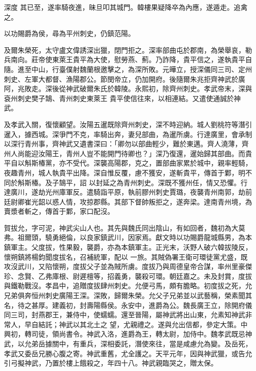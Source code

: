 \begin{pinyinscope}
 深度
 其已至，遂率騎夜進，昧旦叩其城門。韓樓果疑降卒為內應，遂遁走。追禽之。



 以功賜爵為侯，尋為平州刺史，仍鎮范陽。



 及爾朱榮死，太守盧文偉誘深出獵，閉門拒之。深率部曲屯於郡南，為榮舉哀，勒兵南向。莊帝使東萊王貴平為大使，慰勞燕、薊。乃詐降，貴平信之，遂執貴平自隨。進至中山，行臺僕射魏蘭根邀擊之，為深所敗。元曄立，授深儀同三司、定州刺史、左軍大都督、漁陽郡公。節閔帝立，仍加開府。後隨爾朱兆拒齊神武於廣阿，兆敗走。深後從神武破爾朱氏於韓陵。永熙初，除齊州刺史。孝武帝末，深與袞州刺史樊子鵠、青州刺史東萊王
 貴平使信往來，以相連結。又遣使通誠於神武。



 及孝武入關，復懷顧望。汝陽五暹既除齊州刺史，深不時迎納。城人劉桃符等潛引暹入，據西城。深爭門不克，率騎出奔，妻兒部曲，為暹所虜。行達廣里，會承制以深行青州事，齊神武又遺書深曰：「卿勿以部曲輕少，難於東邁。齊人澆薄，齊州人尚能迎汝陽王，青州人豈不能開門待卿也？」深乃復還，暹始歸其部曲。而貴平自以斛斯椿黨，亦不受代。深襲高陽郡，克之，置部曲家累於城中，親率輕騎，夜趣青州，城人執貴平出降。深自惟反覆，慮不獲安，遂斬貴平，傳首于鄴，明不同於斛斯椿。及子鵠平，詔
 以封延之為青州刺史。深既不獲州任，情又恐懼。行達廣川，遂劫光州庫軍反。遣騎詣平原，執前膠州刺史賈璐，夜襲青州南郭，劫前廷尉卿崔光韶以惑人情，攻掠郡縣。其部下督帥叛拒之，遂奔梁。達南青州境，為賣漿者斬之，傳首于鄴，家口配沒。



 賀拔允，字可泥，神武尖山人也。其先與魏氏同出陰山，有如回者，魏初為大莫弗。祖爾頭，驍勇絕倫，以良家鎮武川，因家焉。獻文時以功賜爵龍城縣男，為本鎮軍主。父度拔，性果毅，襲爵，亦為本鎮軍主。正光末，沃野人破六韓拔陵反，懷朔鎮將楊鈞聞度拔名，召補統軍，配以
 一旅。其賊偽署王衛可環徒黨尤盛，既攻沒武川，又陷懷朔，度拔父子並為賊所虜。度拔乃與周德皇帝合謀，率州里豪傑珍、念賢、乙弗庫根、尉遲檀等，招義勇，襲殺可環。朝廷嘉之。未及封賞，度拔與鐵勒戰沒。孝昌中，追贈度拔肆州刺史。允便弓馬，頗有膽略。初度拔之死，允兄弟俱奔恒州刺史廣陽王深。深敗，歸爾朱榮。允父子兄弟並以武藝稱，榮素聞其名，待之甚厚。建義初，封壽陽縣侯。永安中，進爵為公。魏長廣王立，除開府儀同三司，封燕郡王，兼侍中，使蠕蠕。還至晉陽，屬神武將出山東，允素知神武非常人，早自結託；神武以其北土之
 望，尤親禮之。遂與允出信都，參定大策。中興初，轉司徒，領尚書令。神武入洛，進爵為王，轉太尉，加侍中。魏孝武既忌神武，以允弟岳據關中，有重兵，深相委託，潛使來往，當是咸慮允為變。及岳死，孝武又委岳兄勝心腹之寄。神武重舊，尤全護之。天平元年，因與神武獵，或告允引弓擬神武，乃置於樓上餓殺之，年四十八。神武親臨哭之，贈太保。




\end{pinyinscope}
